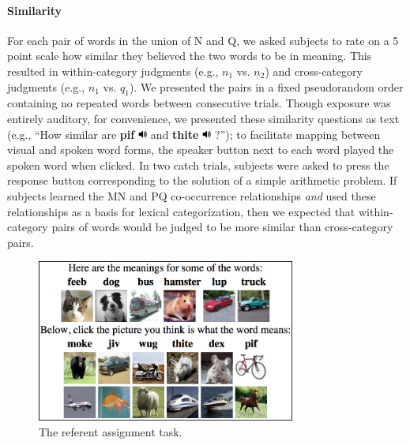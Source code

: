 \documentclass[man,floatsintext]{apa6}
\begin{document}
\paragraph{Similarity}
For each pair of words in the union of N and Q, we asked subjects to rate on a 5 point scale how similar they believed the two words to be in meaning. This resulted in within-category judgments (e.g., $n_1$ vs. $n_2$) and cross-category judgments (e.g., $n_1$ vs. $q_1$).	We presented the pairs in a fixed pseudorandom order containing no repeated words between consecutive trials. Though exposure was entirely auditory, for convenience, we presented these similarity questions as text (e.g., ``How similar are \textbf{pif} \includegraphics[width=0.3cm]{play.png} and \textbf{thite} \includegraphics[width=0.3cm]{play.png} ?''); to facilitate mapping between visual and spoken word forms, the speaker button next to each word played the spoken word when clicked. In two catch trials, subjects were asked to press the response button corresponding to the solution of a simple arithmetic problem. If subjects learned the MN and PQ co-occurrence relationships \emph{and} used these relationships as a basis for lexical categorization, then we expected that within-category pairs of words would be judged to be more similar than cross-category pairs.

\begin{figure}[t]
\begin{center}
  \includegraphics[width=8.5cm]{meaning-html-cropped.png}
  \caption{The referent assignment task.}
  \label{meaning-task}
\end{center}
\end{figure}
\end{document}

